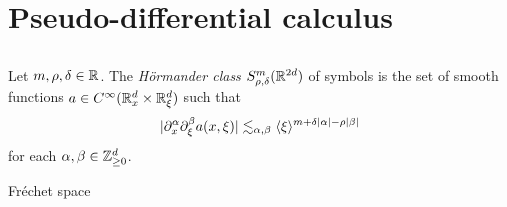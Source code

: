\documentclass{../../large}
\begin{document}

\chapter{Pseudo-differential calculus}
\section{}

\begin{prb}
Let $m,\rho,\delta\in\mathbb{R}$.
The \emph{H\"ormander class} $S_{\rho,\delta}^m(\mathbb{R}^{2d})$ of symbols is the set of smooth functions $a\in C^\infty(\mathbb{R}_x^d\times\mathbb{R}_\xi^d)$ such that
\[|\partial_x^\alpha\partial_\xi^\beta a(x,\xi)|\lesssim_{\alpha,\beta}\langle\xi\rangle^{m+\delta|\alpha|-\rho|\beta|}\]
for each $\alpha,\beta\in\mathbb{Z}_{\ge0}^d$.
\begin{parts}
\item Fr\'echet space
\end{parts}
\end{prb}
\end{document}
